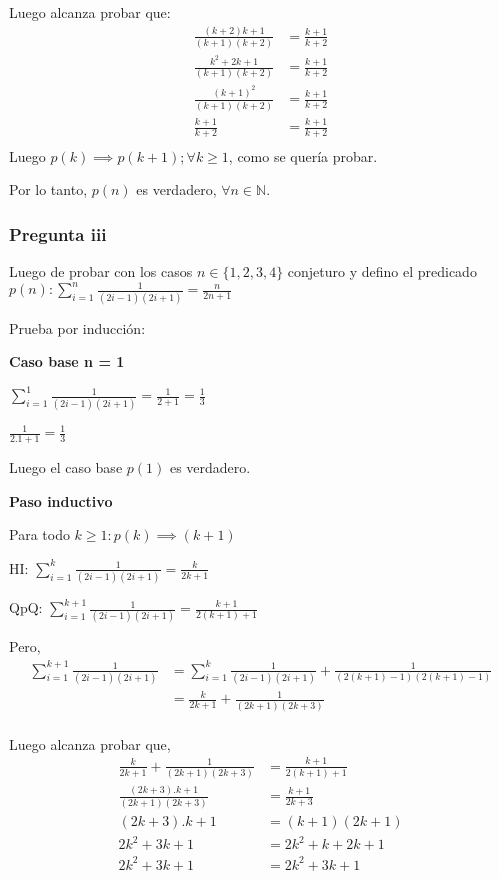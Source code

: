 Luego alcanza probar que:
\begin{align*}
    \frac{(k+2)k + 1}{(k+1)(k+2)} &= \frac{k+1}{k+2} \\
    \frac{k^2 + 2k + 1}{(k+1)(k+2)} &= \frac{k+1}{k+2} \\
    \frac{(k+1)^2}{(k+1)(k+2)} &= \frac{k+1}{k+2} \\
    \frac{k+1}{k+2} &= \frac{k+1}{k+2} \\
\end{align*}
Luego $p(k) \implies p(k+1); \forall k \geq 1$, como se quería probar.

Por lo tanto, $p(n)$ es verdadero, $\forall n \in \mathbb{N}$.

\subsubsection{Pregunta iii}

Luego de probar con los casos $n \in \{ 1,2,3,4 \}$ conjeturo y defino el predicado $p(n): \sum_{i=1}^{n}\frac{1}{(2i-1)(2i+1)} = \frac{n}{2n+1}$

Prueba por inducción:

\textbf{Caso base n = 1}

$ \sum_{i=1}^{1}\frac{1}{(2i-1)(2i+1)} = \frac{1}{2+1} = \frac{1}{3}$

$ \frac{1}{2.1+1} = \frac{1}{3}$

Luego el caso base $p(1)$ es verdadero.

\textbf{Paso inductivo}

Para todo $k \geq 1: p(k) \implies (k+1)$

HI: $\sum_{i=1}^{k}\frac{1}{(2i-1)(2i+1)} = \frac{k}{2k+1}$

QpQ: $\sum_{i=1}^{k+1}\frac{1}{(2i-1)(2i+1)} = \frac{k+1}{2(k+1)+1}$

Pero,
\begin{align*}
    \sum_{i=1}^{k+1}\frac{1}{(2i-1)(2i+1)} &= \sum_{i=1}^{k}\frac{1}{(2i-1)(2i+1)} + \frac{1}{(2(k+1)-1)(2(k+1)-1)} \\
    &= \frac{k}{2k+1} + \frac{1}{(2k+1)(2k+3)} \\
\end{align*}

Luego alcanza probar que,
\begin{align*}
    \frac{k}{2k+1} + \frac{1}{(2k+1)(2k+3)} &= \frac{k+1}{2(k+1)+1} \\
    \frac{(2k+3).k + 1}{(2k+1)(2k+3)} &= \frac{k+1}{2k+3} \\
    (2k+3).k + 1 &= (k+1)(2k+1) \\
    2k^2 + 3k + 1 &= 2k^2 + k + 2k +1 \\
    2k^2 + 3k + 1 &= 2k^2 + 3k +1 \\
\end{align*}

